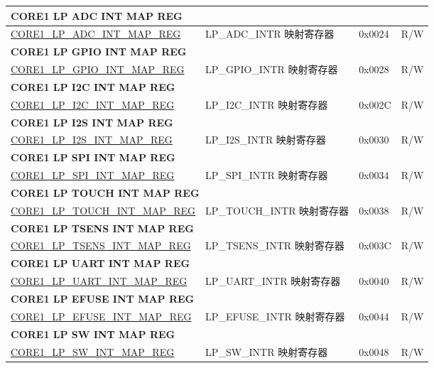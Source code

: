 \begin{longtable}{ | p{7.5cm} | p{7.2cm} | p{1.3cm} | p{1cm} | }
\multicolumn{4}{|l|}{\textbf{CORE1 LP ADC INT MAP REG}} \\ \hline
\hyperref[regdesc:CORE1LPADCINTMAPREG]{CORE1\_LP\_ADC\_INT\_MAP\_REG} & LP\_ADC\_INTR 映射寄存器 & 0x0024 & R/W \\ \hline
\multicolumn{4}{|l|}{\textbf{CORE1 LP GPIO INT MAP REG}} \\ \hline
\hyperref[regdesc:CORE1LPGPIOINTMAPREG]{CORE1\_LP\_GPIO\_INT\_MAP\_REG} & LP\_GPIO\_INTR 映射寄存器 & 0x0028 & R/W \\ \hline
\multicolumn{4}{|l|}{\textbf{CORE1 LP I2C INT MAP REG}} \\ \hline
\hyperref[regdesc:CORE1LPI2CINTMAPREG]{CORE1\_LP\_I2C\_INT\_MAP\_REG} & LP\_I2C\_INTR 映射寄存器 & 0x002C & R/W \\ \hline
\multicolumn{4}{|l|}{\textbf{CORE1 LP I2S INT MAP REG}} \\ \hline
\hyperref[regdesc:CORE1LPI2SINTMAPREG]{CORE1\_LP\_I2S\_INT\_MAP\_REG} & LP\_I2S\_INTR 映射寄存器 & 0x0030 & R/W \\ \hline
\multicolumn{4}{|l|}{\textbf{CORE1 LP SPI INT MAP REG}} \\ \hline
\hyperref[regdesc:CORE1LPSPIINTMAPREG]{CORE1\_LP\_SPI\_INT\_MAP\_REG} & LP\_SPI\_INTR 映射寄存器 & 0x0034 & R/W \\ \hline
\multicolumn{4}{|l|}{\textbf{CORE1 LP TOUCH INT MAP REG}} \\ \hline
\hyperref[regdesc:CORE1LPTOUCHINTMAPREG]{CORE1\_LP\_TOUCH\_INT\_MAP\_REG} & LP\_TOUCH\_INTR 映射寄存器 & 0x0038 & R/W \\ \hline
\multicolumn{4}{|l|}{\textbf{CORE1 LP TSENS INT MAP REG}} \\ \hline
\hyperref[regdesc:CORE1LPTSENSINTMAPREG]{CORE1\_LP\_TSENS\_INT\_MAP\_REG} & LP\_TSENS\_INTR 映射寄存器 & 0x003C & R/W \\ \hline
\multicolumn{4}{|l|}{\textbf{CORE1 LP UART INT MAP REG}} \\ \hline
\hyperref[regdesc:CORE1LPUARTINTMAPREG]{CORE1\_LP\_UART\_INT\_MAP\_REG} & LP\_UART\_INTR 映射寄存器 & 0x0040 & R/W \\ \hline
\multicolumn{4}{|l|}{\textbf{CORE1 LP EFUSE INT MAP REG}} \\ \hline
\hyperref[regdesc:CORE1LPEFUSEINTMAPREG]{CORE1\_LP\_EFUSE\_INT\_MAP\_REG} & LP\_EFUSE\_INTR 映射寄存器 & 0x0044 & R/W \\ \hline
\multicolumn{4}{|l|}{\textbf{CORE1 LP SW INT MAP REG}} \\ \hline
\hyperref[regdesc:CORE1LPSWINTMAPREG]{CORE1\_LP\_SW\_INT\_MAP\_REG} & LP\_SW\_INTR 映射寄存器 & 0x0048 & R/W \\ \hline

\end{longtable}
